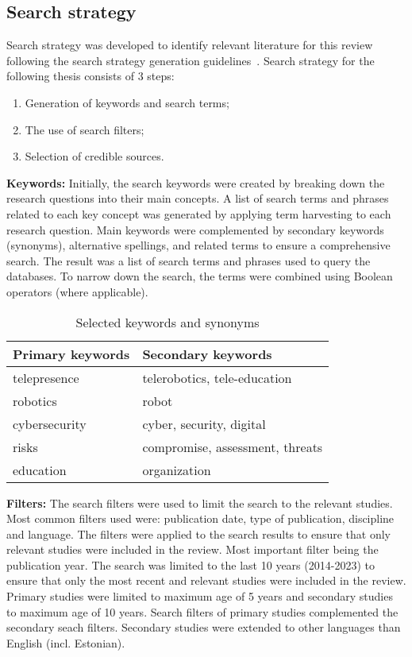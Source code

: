 \subsection{Search strategy}\label{subsec:search-strategy}

Search strategy was developed to identify relevant literature for this review following the search strategy generation guidelines~\cite[7-8]{systematic_review_2004}. Search strategy for the following thesis consists of 3 steps:

\begin{enumerate}
  \item Generation of keywords and search terms;
  \item The use of search filters;
  \item Selection of credible sources.
\end{enumerate}

\textbf{Keywords:} Initially, the search keywords were created by breaking down the research questions into their main concepts. A list
of search terms and phrases related to each key concept was generated by applying term harvesting to each research question. Main keywords
were
complemented by secondary keywords (synonyms), alternative spellings, and related terms to ensure a comprehensive search. The
result was a list of
search terms and phrases used to query the databases. To narrow down the search, the terms were combined using Boolean operators (where
applicable).

\begin{table}[h]
  \centering
  \caption{Selected keywords and synonyms}
  \label{tab:keywords}
  \begin{tabular}{|l|l|}
    \hline
    \textbf{Primary keywords} & \textbf{Secondary keywords}     \\\hline
    telepresence              & telerobotics, tele-education    \\\hline
    robotics                  & robot                           \\\hline
    cybersecurity             & cyber, security, digital        \\\hline
    risks                     & compromise, assessment, threats \\\hline
    education                 & organization                    \\\hline
  \end{tabular}
\end{table}

\textbf{Filters:} The search filters were used to limit the search to the relevant studies. Most common filters used were: publication
date, type of publication, discipline and language. The filters were applied to the search results to ensure that only relevant studies were
included in the review. Most important filter being the publication year. The search was limited to the last 10 years (2014-2023) to
ensure that only the most recent and relevant studies were included in the review. Primary studies were limited to maximum age of 5
years and secondary studies to maximum age of 10 years. Search filters of primary studies complemented the secondary seach filters.
Secondary studies were extended to other languages than English (incl. Estonian).

